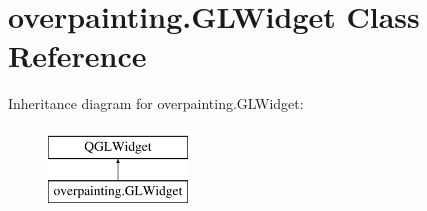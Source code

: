 \hypertarget{classoverpainting_1_1GLWidget}{}\section{overpainting.\+G\+L\+Widget Class Reference}
\label{classoverpainting_1_1GLWidget}
Inheritance diagram for overpainting.\+G\+L\+Widget\+:\begin{figure}[H]
\begin{center}
\leavevmode
\includegraphics[height=2.000000cm]{classoverpainting_1_1GLWidget}
\end{center}
\end{figure}
